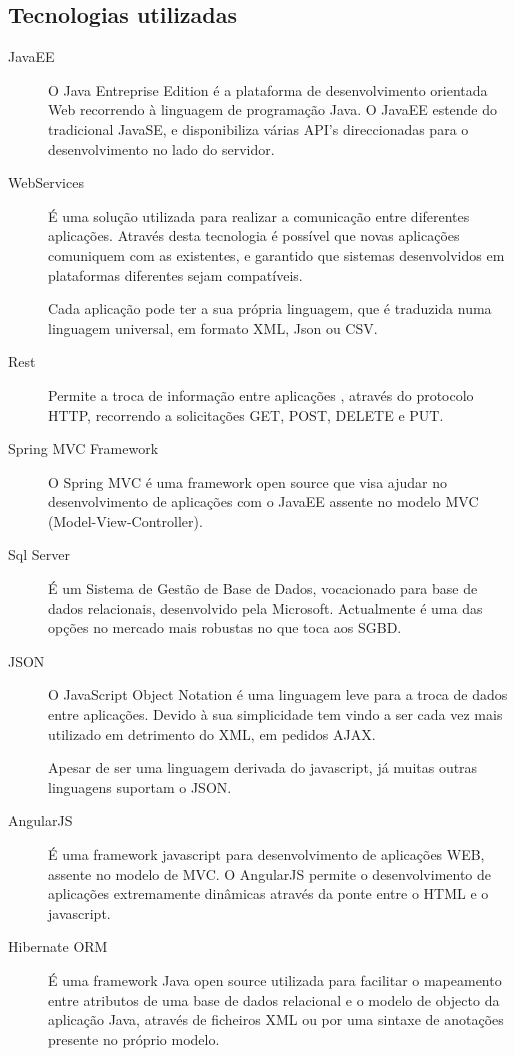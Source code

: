 \subsection{Tecnologias utilizadas}
\begin{description}
  \item[JavaEE] O Java Entreprise Edition é a plataforma de desenvolvimento orientada Web recorrendo à linguagem de programação Java. O JavaEE estende do tradicional JavaSE, e disponibiliza várias API’s direccionadas para o desenvolvimento no lado do servidor.
  \item[WebServices] É uma solução utilizada para realizar a comunicação entre diferentes aplicações. Através desta tecnologia é possível que novas aplicações comuniquem com as existentes, e garantido que sistemas desenvolvidos em plataformas diferentes sejam compatíveis. 
\par Cada aplicação pode ter a sua própria linguagem, que é traduzida numa linguagem universal, em formato XML,  Json ou CSV.
  \item[Rest] Permite a troca de informação entre aplicações , através do protocolo HTTP, recorrendo a solicitações GET, POST, DELETE e PUT.
  \item[Spring MVC Framework] O Spring MVC é uma framework open source que visa ajudar no desenvolvimento de aplicações com o JavaEE assente no modelo MVC (Model-View-Controller).
  \item[Sql Server] É um Sistema de Gestão de Base de Dados, vocacionado para base de dados relacionais, desenvolvido pela Microsoft. Actualmente é uma das opções no mercado mais robustas no que toca aos SGBD.
  \item[JSON] O JavaScript Object Notation é uma linguagem leve para a troca de dados entre aplicações. Devido à sua simplicidade tem vindo a ser cada vez mais utilizado em detrimento do XML, em pedidos AJAX. 
\par Apesar de ser uma linguagem derivada do javascript, já muitas outras linguagens suportam o JSON.
  \item[AngularJS] É uma framework javascript para desenvolvimento de aplicações WEB, assente no modelo de MVC. O AngularJS permite o desenvolvimento de aplicações extremamente dinâmicas através da ponte entre o HTML e o javascript. 
  \item[Hibernate ORM] É uma framework Java open source utilizada para facilitar o mapeamento entre atributos de uma base de dados relacional e o modelo de objecto da aplicação Java, através de ficheiros XML ou por uma sintaxe de anotações presente no próprio modelo.

\end{description}
